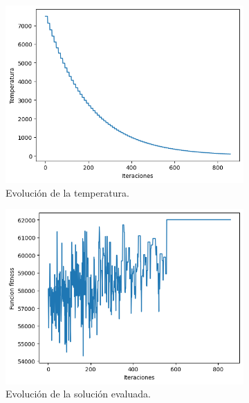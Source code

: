 \documentclass[a4paper,12pt]{article}
\begin{document}
	\begin{figure}[H]
		\centering
		\begin{subfigure}{.45\textwidth}
			\centering
			\includegraphics[width=\textwidth]{include/ultima_ejec/temp.png}
			\caption{Evolución de la temperatura. }
		\end{subfigure}
		\hfill
		\begin{subfigure}{.45\textwidth}
			\centering
			\includegraphics[width=\textwidth]{include/ultima_ejec/f.png}
			\caption{Evolución de la solución evaluada. }
		\end{subfigure}
		\hfill
		\begin{subfigure}{.45\textwidth}
			\centering

\end{subfigure}
\end{figure}
\end{document}
